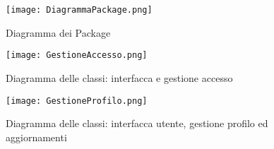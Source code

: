 \begin{figure}[h!]
    \begin{center}
        \texttt{[image: DiagrammaPackage.png]}
        \caption{Diagramma dei Package}
    \end{center}
\end{figure}



\begin{figure}[h!]
    \begin{center}
        \texttt{[image: GestioneAccesso.png]}
        \caption{Diagramma delle classi: interfacca e gestione accesso}
    \end{center}
\end{figure}


\begin{figure}[h!]
    \begin{center}
        \texttt{[image: GestioneProfilo.png]}
        \caption{Diagramma delle classi: interfacca utente, gestione profilo ed aggiornamenti}
    \end{center}
\end{figure}
\clearpage